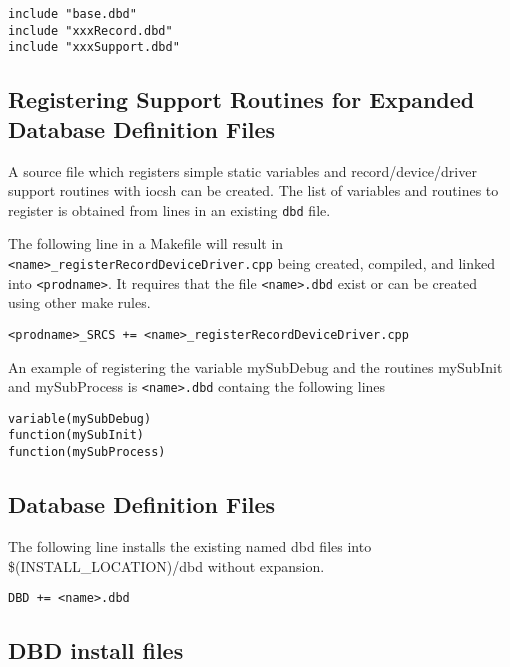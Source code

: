 \begin{verbatim}
include "base.dbd"
include "xxxRecord.dbd"
include "xxxSupport.dbd"
\end{verbatim}

\subsection{Registering Support Routines for Expanded Database Definition Files}

A source file which registers simple static variables and record/device/driver support routines with iocsh can be created. 
The list of variables and routines to register is obtained from lines in an existing \verb|dbd| file.

The following line in a Makefile will result in \verb|<name>_registerRecordDeviceDriver.cpp| being created, 
compiled, and linked into \verb|<prodname>|. It requires that the file \verb|<name>.dbd| exist or can be created using other make rules.

\begin{verbatim}
<prodname>_SRCS += <name>_registerRecordDeviceDriver.cpp
\end{verbatim}

An example of registering the variable mySubDebug and the routines mySubInit and mySubProcess is \verb|<name>.dbd| 
containg the following lines

\begin{verbatim}
variable(mySubDebug)
function(mySubInit)
function(mySubProcess)
\end{verbatim}

\subsection{Database Definition Files}

The following line installs the existing named dbd files into \$(INSTALL\_LOCATION)/dbd without expansion.

\begin{verbatim}
DBD += <name>.dbd
\end{verbatim}

\subsection{DBD install files}

